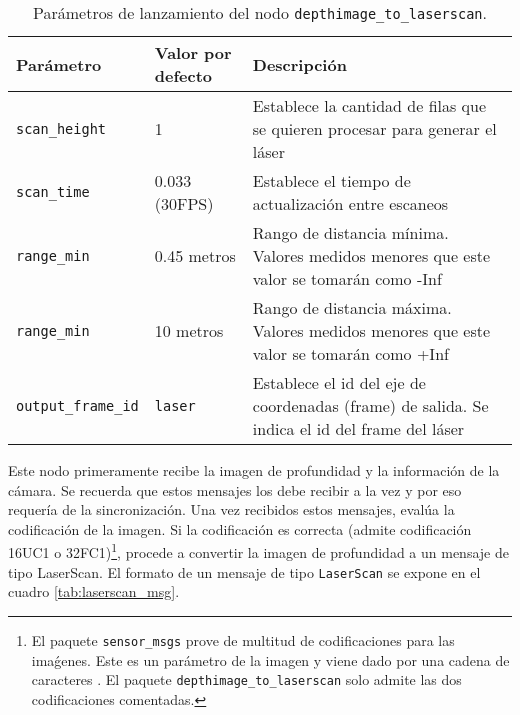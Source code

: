 \begin{table}[H]
\begin{center}
\begin{tabular}{| w{c}{3cm} | w{c}{3cm} | m{7.5cm} |}
	\hline
	Parámetro & Valor por defecto & Descripción \\ \hline
	\texttt{scan\_height} & 1 & Establece la cantidad de filas que se quieren procesar para generar el láser \\ \hline
	\texttt{scan\_time} & 0.033 (30FPS) & Establece el tiempo de actualización entre escaneos \\ \hline
	\texttt{range\_min} & 0.45 metros & Rango de distancia mínima. Valores medidos menores que este valor se tomarán como -Inf \\ \hline
	\texttt{range\_min} & 10 metros & Rango de distancia máxima. Valores medidos menores que este valor se tomarán como +Inf \\ \hline
	\texttt{output\_frame\_id} & \texttt{laser} & Establece el id del eje de coordenadas (frame) de salida. Se indica el id del frame del láser \\ \hline
\end{tabular}
\caption{Parámetros de lanzamiento del nodo \texttt{depthimage\_to\_laserscan}.}
\label{tab:param_depthimage}
\end{center}
\end{table} 

Este nodo primeramente recibe la imagen de profundidad y la información de la cámara. Se recuerda que estos mensajes los debe recibir a la vez y por eso requería de la sincronización. Una vez recibidos estos mensajes, evalúa la codificación de la imagen. Si la codificación es correcta (admite codificación 16UC1 o 32FC1)\footnote{El paquete \texttt{sensor\_msgs} prove de multitud de codificaciones para las imaǵenes. Este es un parámetro de la imagen y viene dado por una cadena de caracteres \cite{enc}. El paquete \texttt{depthimage\_to\_laserscan} solo admite las dos codificaciones comentadas.}, procede a convertir la imagen de profundidad a un mensaje de tipo LaserScan. El formato de un mensaje de tipo \texttt{LaserScan} se expone en el cuadro \ref{tab:laserscan_msg}.\\

